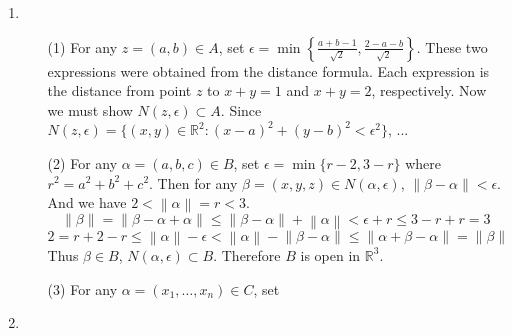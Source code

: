 \documentclass[12pt]{report}
\newcommand{\numl}[1]{\item[\large\textbf{\sffamily #1.}]}
\newcommand{\bb}[1]{\mathbb{#1}}
\newcommand{\norm}[1]{\left\lVert#1\right\rVert}
\newcommand{\ds}{\displaystyle}
\begin{document}
\begin{enumerate}
\numl{7}
\begin{enumerate}
	\item[(1)] For any $z = (a, b)\in A$, set $\epsilon = \min\left\{\ds \frac{a+b-1}{\sqrt{2}}, \frac{2-a-b}{\sqrt{2}} \right\}$. These two expressions were obtained from the distance formula. Each expression is the distance from point $z$ to $x+y=1$ and $x+y=2$, respectively. Now we must show $N(z, \epsilon) \subset A$. Since $N(z, \epsilon) = \{(x, y)\in \bb{R}^2: (x - a)^2 + (y - b)^2 < \epsilon^2 \}$, ...
	\item[(2)] For any $\alpha = (a, b, c)\in B$, set $\epsilon = \min\{r-2, 3-r \}$ where $r^2 = a^2+b^2+c^2$. Then for any $\beta = (x, y, z) \in N(\alpha, \epsilon)$, $\norm{\beta - \alpha} < \epsilon$. And we have $2 < \norm{\alpha} = r <3 $. $$\norm{\beta} = \norm{\beta - \alpha + \alpha}\leq \norm{\beta - \alpha} +\norm{\alpha} < \epsilon + r \leq 3-r + r = 3$$
	$$2 = r + 2-r \leq \norm{\alpha} - \epsilon < \norm{\alpha} -\norm{\beta-\alpha} \leq \norm{\alpha + \beta - \alpha} = \norm{\beta}$$ 
	Thus $\beta \in B$, $N(\alpha, \epsilon) \subset B$. Therefore $B$ is open in $\bb{R}^3$.
	\item[(3)] For any $\alpha = (x_1, \dots, x_n) \in C$, set 
\end{enumerate}

\numl{8}


\end{enumerate}
\end{document}
